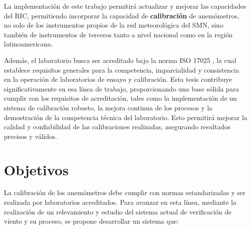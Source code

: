  La implementación de este trabajo permitirá actualizar y mejorar las capacidades del RIC, permitiendo incorporar la capacidad de \textbf{calibración} de anemómetros, no solo de los instrumentos propios de la red meteorológica del SMN, sino también de instrumentos de terceros tanto a nivel nacional como en la región latinoamericana. 

Además, el laboratorio busca ser acreditado bajo la norma ISO 17025 \cite{ISO17025}, la cual establece requisitos generales para la competencia, imparcialidad y consistencia en la operación de laboratorios de ensayo y calibración. Esta tesis contribuye significativamente en esa línea de trabajo, proporcionando una base sólida para cumplir con los requisitos de acreditación, tales como la implementación de un sistema de calibración robusto, la mejora continua de los procesos y la demostración de la competencia técnica del laboratorio. Esto permitirá mejorar la calidad y confiabilidad de las calibraciones realizadas, asegurando resultados precisos y válidos.

\section{Objetivos}\label{sec:objetivos}

La calibración de los anemómetros debe cumplir con normas estandarizadas \cite{IEC61400-12-1} \cite{ISO16622} \cite{ISO17713-1} y ser realizada por laboratorios acreditados. Para avanzar en esta línea, mediante la realización de un relevamiento y estudio del sistema actual de verificación de viento y su proceso, se propone desarrollar un sistema que:

